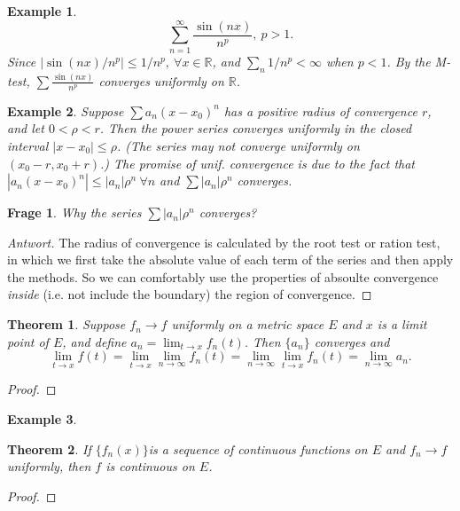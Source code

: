 \documentclass[12pt]{article}
\newtheorem{thm}{Theorem}[section]
\newtheorem{ex}{Example}[section]
\newtheorem*{q}{Frage}
\newcommand{\fseq}{$\{f_n(x)\}$}
\newcommand{\R}{\mathbb{R}}
\begin{document}
\begin{ex}
	\[\sum_{n = 1}^{\infty} \frac{\sin(nx)}{n^p}, ~p>1.\] Since $|\sin(nx)/n^p| \leq 1/n^p, ~\forall x \in \R$, and $\sum_n 1/n^p < \infty$ when $p < 1$. By the M-test, $\sum \frac{\sin(nx)}{n^p}$ converges uniformly on $\R$.
\end{ex}
\begin{ex}
	Suppose $\sum a_n(x-x_0)^n$ has a positive radius of convergence $r$, and let $0 < \rho < r$. Then the power series converges uniformly in the closed interval $|x-x_0| \leq \rho$. (The series may not converge uniformly on $(x_0 - r, x_0 + r)$.) The promise of unif. convergence is due to the fact that $|a_n(x-x_0)^n| \leq |a_n|\rho^n ~\forall n$ and $\sum |a_n|\rho^n$ converges.
\end{ex}

\begin{q}
	Why the series $\sum |a_n|\rho^n$ converges?
\end{q}
\begin{proof}[Antwort]
	The radius of convergence is calculated by the root test or ration test, in which we first take the absolute value of each term of the series and then apply the methods. So we can comfortably use the properties of absoulte convergence \emph{inside} (i.e. not include the boundary) the region of convergence.
\end{proof}

\begin{thm}\label{thm:lim_exchange}
	Suppose $f_n \rightarrow f$ uniformly on a metric space $E$ and $x$ is a limit point of $E$, and define $a_n = \lim_{t \rightarrow x} f_n(t)$. Then $\{ a_n \}$ converges and \[\lim_{t \rightarrow x} f(t) = \lim_{t \rightarrow x}\lim_{n \rightarrow \infty} f_n(t) = \lim_{n \rightarrow \infty}\lim_{t \rightarrow x} f_n(t) = \lim_{n \rightarrow \infty} a_n.\]
\end{thm}
\begin{proof}
	
\end{proof}

\begin{ex}
	
\end{ex}

\begin{thm}
	If \fseq is a sequence of continuous functions on $E$ and $f_n \rightarrow f$ uniformly, then $f$ is continuous on $E$.
\end{thm}
\begin{proof}
	
\end{proof}
\end{document}
